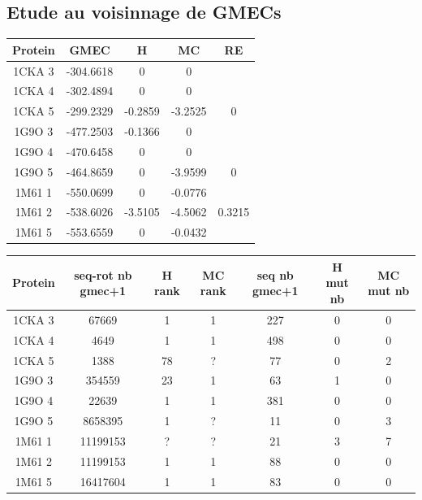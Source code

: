    \subsection{ Etude au voisinnage de GMECs}


    \begin{table}[h]
      \centering

      \begin{tabular}{|c|c|c|c|c|}


        \hline
        Protein & GMEC & H & MC & RE \\
        \hline
        1CKA 3 & -304.6618 & 0 & 0 & \\
        1CKA 4 & -302.4894 & 0 & 0 & \\
        1CKA 5 & -299.2329 & -0.2859 & -3.2525 & 0 \\
        1G9O 3 & -477.2503 & -0.1366 & 0 & \\
        1G9O 4 & -470.6458 & 0 & 0 & \\
        1G9O 5 & -464.8659 & 0 & -3.9599 &  0 \\
        1M61 1 & -550.0699 & 0 & -0.0776 & \\
        1M61 2 & -538.6026 & -3.5105 & -4.5062 & 0.3215 \\
        1M61 5 & -553.6559 & 0 & -0.0432 & \\
        
        \hline


 \end{tabular}      
 \label{tab_1}      
\end{table}


    \begin{table}[h]
      \centering

      \begin{tabular}{|c|c|c|c|c|c|c|}


        \hline
        Protein & seq-rot nb gmec+1 & H rank  & MC rank  & seq nb gmec+1 & H mut nb & MC mut nb \\
        \hline
        1CKA 3 & 67669 & 1 & 1 & 227 & 0 & 0 \\
        1CKA 4 & 4649 & 1 & 1 & 498 & 0 & 0 \\
        1CKA 5 & 1388 & 78 & ? & 77 & 0 & 2 \\
        1G9O 3 & 354559 & 23 & 1 & 63 & 1 & 0 \\
        1G9O 4 & 22639 & 1 & 1 & 381 & 0 & 0 \\
        1G9O 5 & 8658395 & 1 & ? &  11 & 0 & 3 \\
        1M61 1 & 11199153 & ? & ? & 21 & 3 & 7 \\
        1M61 2 & 11199153 & 1 & 1 & 88 & 0 & 0 \\
        1M61 5 & 16417604 & 1 & 1 & 83 & 0 & 0 \\
        
        \hline


 \end{tabular}      
 \label{tab_2}      
\end{table}


